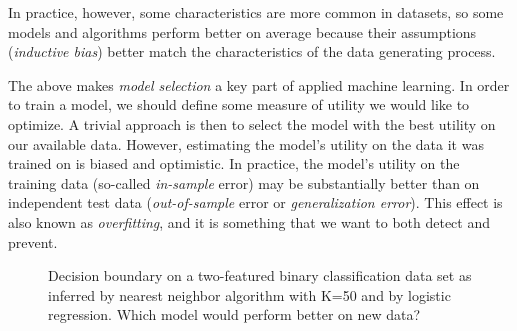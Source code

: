 \begin{refsection}
In practice, however, some characteristics are more common in datasets, so some models and algorithms perform better on average because their assumptions ({\em inductive bias}) better match the characteristics of the data generating process.

The above makes {\em model selection} a key part of applied machine learning. In order to train a model, we should define some measure of utility we would like to optimize. A trivial approach is then to select the model with the best utility on our available data. However, estimating the model's utility on the data it was trained on is biased and optimistic. In practice, the model's utility on the training data (so-called {\em in-sample} error) may be substantially better than on independent test data ({\em out-of-sample} error or {\em generalization error}). This effect is also known as {\em overfitting}, and it is something that we want to both detect and prevent.

\begin{figure}
\label{fig:1-nn}
\caption{Decision boundary on a two-featured binary classification data set as inferred by nearest neighbor algorithm with K=50 and by logistic regression. Which model would perform better on new data?}
\end{figure}


\end{refsection}
